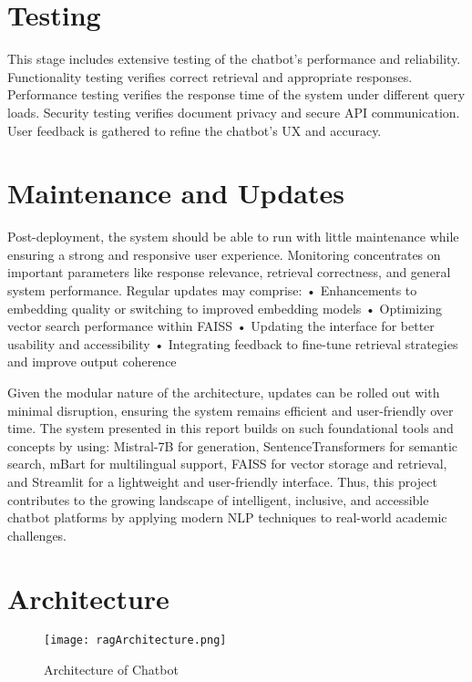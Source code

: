 \documentclass[12pt]{report}
\begin{document}
\section{Testing}
This stage includes extensive testing of the chatbot's performance and reliability. Functionality testing verifies correct retrieval and appropriate responses. Performance testing verifies the response time of the system under different query loads. Security testing verifies document privacy and secure API communication. User feedback is gathered to refine the chatbot's UX and accuracy.

\section{Maintenance and Updates}
Post-deployment, the system should be able to run with little maintenance while ensuring a strong and responsive user experience. Monitoring concentrates on important parameters like response relevance, retrieval correctness, and general system performance. Regular updates may comprise:
• Enhancements to embedding quality or switching to improved embedding models
• Optimizing vector search performance within FAISS
• Updating the interface for better usability and accessibility
• Integrating feedback to fine-tune retrieval strategies and improve output coherence

Given the modular nature of the architecture, updates can be rolled out with minimal disruption, ensuring the system remains efficient and user-friendly over time.
The system presented in this report builds on such foundational tools and concepts by using:
Mistral-7B for generation,
SentenceTransformers for semantic search,
mBart for multilingual support,
FAISS for vector storage and retrieval, and
Streamlit for a lightweight and user-friendly interface.
Thus, this project contributes to the growing landscape of intelligent, inclusive, and accessible chatbot platforms by applying modern NLP techniques to real-world academic challenges.

\newpage
\section{Architecture}
\begin{figure}[h]
    \centering
    \texttt{[image: ragArchitecture.png]}
    \caption{Architecture of Chatbot}
\end{figure}

\newpage
\end{document}
